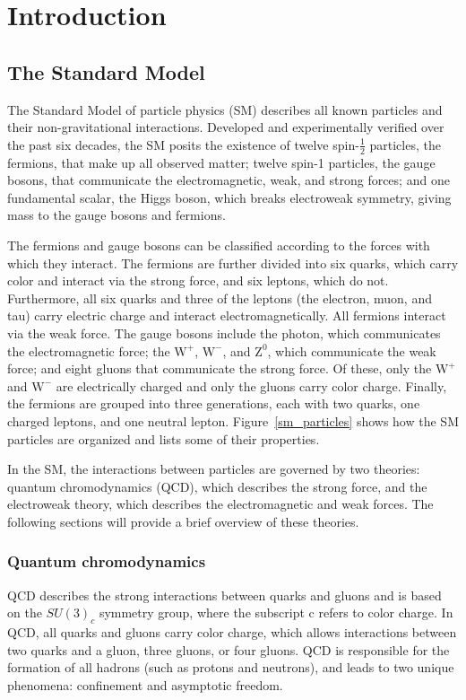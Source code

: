 \chapter{Introduction}
\label{intro}

\section{The Standard Model}
The Standard Model of particle physics (SM) describes all known particles and their non-gravitational interactions. Developed and experimentally verified over the past six decades, the SM posits the existence of twelve spin-$\frac{1}{2}$ particles, the fermions, that make up all observed matter; twelve spin-1 particles, the gauge bosons, that communicate the electromagnetic, weak, and strong forces; and one fundamental scalar, the Higgs boson, which breaks electroweak symmetry, giving mass to the gauge bosons and fermions.

The fermions and gauge bosons can be classified according to the forces with which they interact. The fermions are further divided into six quarks, which carry color and interact via the strong force, and six leptons, which do not. Furthermore, all six quarks and three of the leptons (the electron, muon, and tau) carry electric charge and interact electromagnetically. All fermions interact via the weak force. The gauge bosons include the photon, which communicates the electromagnetic force; the $\mathrm{W}^+$, $\mathrm{W}^-$, and $\mathrm{Z^0}$, which communicate the weak force; and eight gluons that communicate the strong force. Of these, only the $\mathrm{W}^+$ and $\mathrm{W}^-$ are electrically charged and only the gluons carry color charge. Finally, the fermions are grouped into three generations, each with two quarks, one charged leptons, and one neutral lepton.  Figure~\ref{sm_particles} shows how the SM particles are organized and lists some of their properties.



In the SM, the interactions between particles are governed by two theories: quantum chromodynamics (QCD), which describes the strong force, and the electroweak theory, which describes the electromagnetic and weak forces. The following sections will provide a brief overview of these theories.

\subsection{Quantum chromodynamics}
QCD describes the strong interactions between quarks and gluons and is based on the $SU(3)_{c}$ symmetry group, where the subscript c refers to color charge. In QCD, all quarks and gluons carry color charge, which allows interactions between two quarks and a gluon, three gluons, or four gluons. QCD is responsible for the formation of all hadrons (such as protons and neutrons), and leads to two unique phenomena: confinement and asymptotic freedom. 


